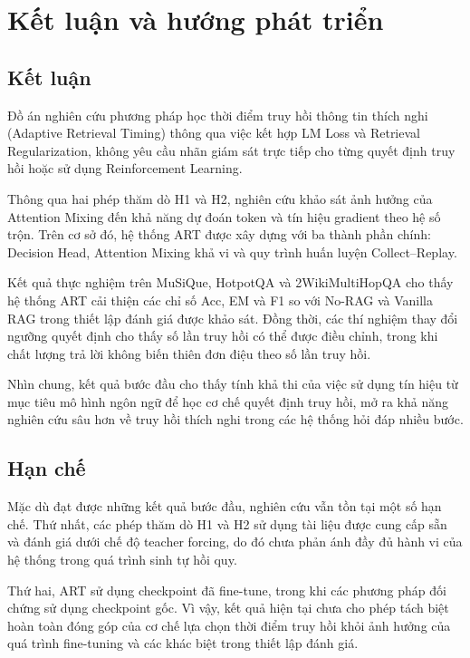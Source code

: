\chapter{Kết luận và hướng phát triển}
\label{chap:conclusion}
\section{Kết luận}

Đồ án nghiên cứu phương pháp học thời điểm truy hồi thông tin thích nghi (Adaptive Retrieval Timing) thông qua việc kết hợp LM Loss và Retrieval Regularization, không yêu cầu nhãn giám sát trực tiếp cho từng quyết định truy hồi hoặc sử dụng Reinforcement Learning.

Thông qua hai phép thăm dò H1 và H2, nghiên cứu khảo sát ảnh hưởng của Attention Mixing đến khả năng dự đoán token và tín hiệu gradient theo hệ số trộn. Trên cơ sở đó, hệ thống ART được xây dựng với ba thành phần chính: Decision Head, Attention Mixing khả vi và quy trình huấn luyện Collect–Replay.

Kết quả thực nghiệm trên MuSiQue, HotpotQA và 2WikiMultiHopQA cho thấy hệ thống ART cải thiện các chỉ số Acc, EM và F1 so với No-RAG và Vanilla RAG trong thiết lập đánh giá được khảo sát. Đồng thời, các thí nghiệm thay đổi ngưỡng quyết định cho thấy số lần truy hồi có thể được điều chỉnh, trong khi chất lượng trả lời không biến thiên đơn điệu theo số lần truy hồi.

Nhìn chung, kết quả bước đầu cho thấy tính khả thi của việc sử dụng tín hiệu từ mục tiêu mô hình ngôn ngữ để học cơ chế quyết định truy hồi, mở ra khả năng nghiên cứu sâu hơn về truy hồi thích nghi trong các hệ thống hỏi đáp nhiều bước.

\section{Hạn chế}

Mặc dù đạt được những kết quả bước đầu, nghiên cứu vẫn tồn tại một số hạn chế. Thứ nhất, các phép thăm dò H1 và H2 sử dụng tài liệu được cung cấp sẵn và đánh giá dưới chế độ teacher forcing, do đó chưa phản ánh đầy đủ hành vi của hệ thống trong quá trình sinh tự hồi quy.

Thứ hai, ART sử dụng checkpoint đã fine-tune, trong khi các phương pháp đối chứng sử dụng checkpoint gốc. Vì vậy, kết quả hiện tại chưa cho phép tách biệt hoàn toàn đóng góp của cơ chế lựa chọn thời điểm truy hồi khỏi ảnh hưởng của quá trình fine-tuning và các khác biệt trong thiết lập đánh giá.

